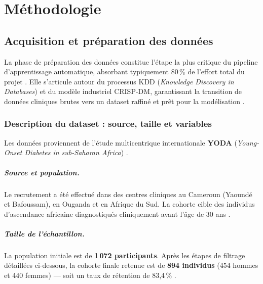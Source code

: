 \chapter{Méthodologie}
\label{chap:methodologie}

\section{Acquisition et préparation des données}
\label{sec:donnees}

La phase de préparation des données constitue l'étape la plus critique du pipeline d'apprentissage
automatique, absorbant typiquement 80\,\% de l'effort total du projet \cite{sorelle2025demarche}.
Elle s'articule autour du processus KDD (\textit{Knowledge Discovery in Databases}) et du modèle
industriel CRISP-DM, garantissant la transition de données cliniques brutes vers un dataset raffiné
et prêt pour la modélisation \cite{contreras2018ai, dagliati2018ml}.

\subsection{Description du dataset : source, taille et variables}
\label{subsec:dataset}

Les données proviennent de l'étude multicentrique internationale \textbf{YODA}
(\textit{Young-Onset Diabetes in sub-Saharan Africa}) \cite{katte2025lancet, oram2025ancestry}.

\paragraph{Source et population.}
Le recrutement a été effectué dans des centres cliniques au Cameroun (Yaoundé et Bafoussam),
en Ouganda et en Afrique du Sud. La cohorte cible des individus d'ascendance africaine
diagnostiqués cliniquement avant l'âge de 30 ans \cite{katte2025lancet}.

\paragraph{Taille de l'échantillon.}
La population initiale est de \textbf{1\,072 participants}. Après les étapes de filtrage détaillées
ci-dessous, la cohorte finale retenue est de \textbf{894 individus} (454 hommes et 440 femmes)
— soit un taux de rétention de 83,4\,\% \cite{katte2025lancet}.

